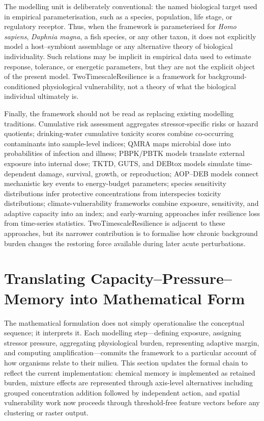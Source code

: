 The modelling unit is deliberately conventional: the named biological target used in empirical parameterisation, such as a species, population, life stage, or regulatory receptor. Thus, when the framework is parameterised for \emph{Homo sapiens}, \emph{Daphnia magna}, a fish species, or any other taxon, it does not explicitly model a host--symbiont assemblage or any alternative theory of biological individuality. Such relations may be implicit in empirical data used to estimate response, tolerance, or energetic parameters, but they are not the explicit object of the present model. TwoTimescaleResilience is a framework for background-conditioned physiological vulnerability, not a theory of what the biological individual ultimately is.

Finally, the framework should not be read as replacing existing modelling traditions. Cumulative risk assessment aggregates stressor-specific risks or hazard quotients; drinking-water cumulative toxicity scores combine co-occurring contaminants into sample-level indices; QMRA maps microbial dose into probabilities of infection and illness; PBPK/PBTK models translate external exposure into internal dose; TKTD, GUTS, and DEBtox models simulate time-dependent damage, survival, growth, or reproduction; AOP--DEB models connect mechanistic key events to energy-budget parameters; species sensitivity distributions infer protective concentrations from interspecies toxicity distributions; climate-vulnerability frameworks combine exposure, sensitivity, and adaptive capacity into an index; and early-warning approaches infer resilience loss from time-series statistics. TwoTimescaleResilience is adjacent to these approaches, but its narrower contribution is to formalise how chronic background burden changes the restoring force available during later acute perturbations.

\section{Translating Capacity--Pressure--Memory into Mathematical Form}
\label{sec:formal_translation}

The mathematical formulation does not simply operationalise the conceptual sequence; it interprets it. Each modelling step---defining exposure, assigning stressor pressure, aggregating physiological burden, representing adaptive margin, and computing amplification---commits the framework to a particular account of how organisms relate to their milieu. This section updates the formal chain to reflect the current implementation: chemical memory is implemented as retained burden, mixture effects are represented through axis-level alternatives including grouped concentration addition followed by independent action, and spatial vulnerability work now proceeds through threshold-free feature vectors before any clustering or raster output.

